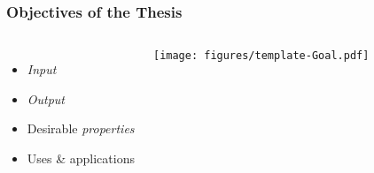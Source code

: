  
  
  
  
  
  
  \begin{frame}
    \frametitle{Objectives of the Thesis}
    \begin{columns}
      \begin{itemize}
          \item \emph{Input}
          \item \emph{Output}
          \item Desirable \emph{properties}
          \item Uses \& applications
      \end{itemize}
       
          \texttt{[image: figures/template-Goal.pdf]}
    \end{columns}
  \end{frame}
  
  
  
